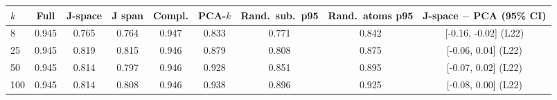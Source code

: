 \begin{tabular}{lcccccccc}\toprule
$k$ & Full & J-space & J span & Compl. & PCA-$k$ & Rand.\ sub.\ p95 & Rand.\ atoms p95 & J-space $-$ PCA (95\% CI)\\\midrule
8 & 0.945 & 0.765 & 0.764 & 0.947 & 0.833 & 0.771 & 0.842 & [-0.16, -0.02] (L22)\\
25 & 0.945 & 0.819 & 0.815 & 0.946 & 0.879 & 0.808 & 0.875 & [-0.06, 0.04] (L22)\\
50 & 0.945 & 0.814 & 0.797 & 0.946 & 0.928 & 0.851 & 0.895 & [-0.07, 0.02] (L22)\\
100 & 0.945 & 0.814 & 0.808 & 0.946 & 0.938 & 0.896 & 0.925 & [-0.08, 0.00] (L22)\\
\bottomrule\end{tabular}
